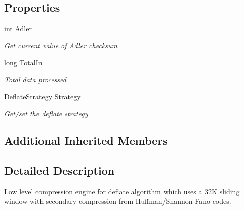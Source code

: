 \subsection*{Properties}
\begin{DoxyCompactItemize}
\item 
int \hyperlink{class_i_c_sharp_code_1_1_sharp_zip_lib_1_1_zip_1_1_compression_1_1_deflater_engine_a7f200b2a518ba674d64e42df619793c9}{Adler}
\begin{DoxyCompactList}\small\item\em Get current value of Adler checksum \end{DoxyCompactList}\item 
long \hyperlink{class_i_c_sharp_code_1_1_sharp_zip_lib_1_1_zip_1_1_compression_1_1_deflater_engine_ac3bade0bd988aff92742075afeb0c69d}{Total\+In}
\begin{DoxyCompactList}\small\item\em Total data processed \end{DoxyCompactList}\item 
\hyperlink{namespace_i_c_sharp_code_1_1_sharp_zip_lib_1_1_zip_1_1_compression_a922c175879503e6b9e35641deccfbc40}{Deflate\+Strategy} \hyperlink{class_i_c_sharp_code_1_1_sharp_zip_lib_1_1_zip_1_1_compression_1_1_deflater_engine_ac02b3d7fc370fe8556b57ce97e2c2741}{Strategy}
\begin{DoxyCompactList}\small\item\em Get/set the \hyperlink{namespace_i_c_sharp_code_1_1_sharp_zip_lib_1_1_zip_1_1_compression_a922c175879503e6b9e35641deccfbc40}{deflate strategy} \end{DoxyCompactList}\end{DoxyCompactItemize}
\subsection*{Additional Inherited Members}


\subsection{Detailed Description}
Low level compression engine for deflate algorithm which uses a 32K sliding window with secondary compression from Huffman/\+Shannon-\/\+Fano codes. 



